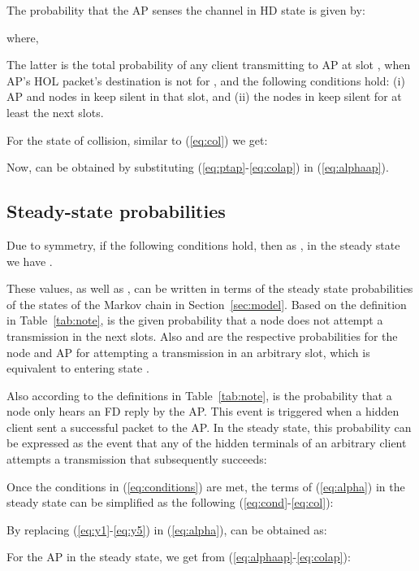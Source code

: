 \documentclass[10pt,journal,cspaper,compsoc]{IEEEtran}
\begin{document}
The probability that the AP senses the channel in HD state is given by:

\small

\normalsize

where,
 \small

\normalsize
The latter is the total probability of any client  transmitting to AP at slot , when AP's HOL packet's destination is not for , and the following conditions hold: (i) AP and nodes in  keep silent in that slot, and (ii) the nodes in  keep silent for at least the next  slots.
  
For the state of collision, similar to (\ref{eq:col}) we get: 
\small

\normalsize
Now,  can be obtained by substituting (\ref{eq:ptap}-\ref{eq:colap}) in (\ref{eq:alphaap}).
\subsection{Steady-state probabilities}
Due to symmetry, if the following conditions hold, then as , in the steady state we have . 



These values, as well as , can be written in terms of the steady state probabilities of the states of the Markov chain in Section~\ref{sec:model}. Based on the definition in Table~\ref{tab:note},  is the given probability that a node does not attempt a transmission in the next  slots. Also  and  are the respective probabilities for the node and AP for attempting a transmission in an arbitrary slot, which is equivalent to entering state .

Also according to the definitions in Table~\ref{tab:note},  is the probability that a node only hears an FD reply by the AP. This event is triggered when a hidden client sent a successful packet to the AP. In the steady state, this probability can be expressed as the event that any of the hidden terminals of an arbitrary client attempts a transmission that subsequently succeeds:


Once the conditions in (\ref{eq:conditions}) are met, the terms of (\ref{eq:alpha}) in the steady state can be simplified as the following (\ref{eq:cond}-\ref{eq:col}):
\small

\normalsize

By replacing (\ref{eq:y1}-\ref{eq:y5}) in (\ref{eq:alpha}),  can be obtained as:
\small

\normalsize


For the AP in the steady state, we get from (\ref{eq:alphaap}-\ref{eq:colap}):
\small
\end{document}

